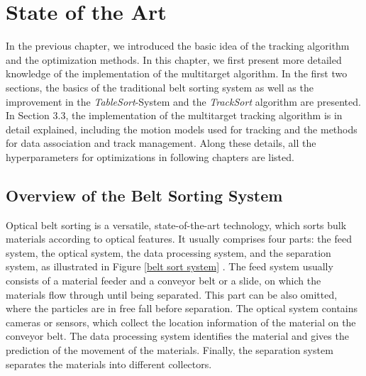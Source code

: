 \chapter{State of the Art}

In the previous chapter, we introduced the basic idea of the tracking algorithm and the optimization methods. In this chapter, we first present more detailed knowledge of the implementation of the multitarget algorithm. In the first two sections, the basics of the traditional belt sorting system as well as the improvement in the \textit{TableSort}-System and the \textit{TrackSort} algorithm are presented. In Section 3.3, the implementation of the multitarget tracking algorithm is in detail explained, including the motion models used for tracking and the methods for data association and track management. Along these details, all the hyperparameters for optimizations in following chapters are listed.


\section{Overview of the Belt Sorting System}

Optical belt sorting is a versatile, state-of-the-art technology, which sorts bulk materials according to optical features. It usually comprises four parts: the feed system, the optical system, the data processing system, and the separation system, as illustrated in Figure \ref{belt sort system} \cite{edwards2004detecting}. The feed system usually consists of a material feeder and a conveyor belt or a slide, on which the materials flow through until being separated. This part can be also omitted, where the particles are in free fall before separation. The optical system contains cameras or sensors, which collect the location information of the material on the conveyor belt. The data processing system identifies the material and gives the prediction of the movement of the materials. Finally, the separation system separates the materials into different collectors.

